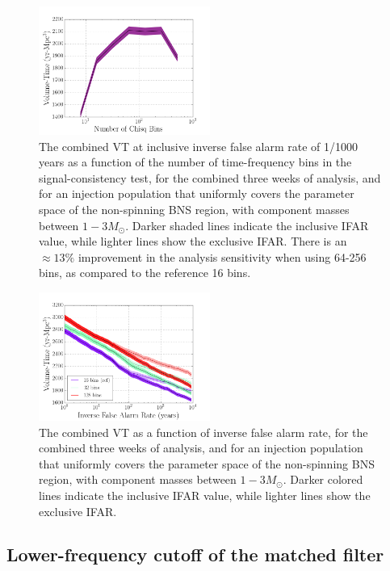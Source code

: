 \begin{figure}
\centering
\includegraphics[width=0.5\textwidth]{papers/bns_o1_dev/figures/cb.png}
\caption{\label{fig:vbin} 
The combined VT at inclusive inverse false alarm rate of 1/1000 years as a function of the number of time-frequency bins in the signal-consistency test, for the combined three weeks of analysis, and for an injection population that uniformly covers the parameter space of the non-spinning BNS region, with component masses between $1- 3M_\odot$. Darker shaded lines indicate the inclusive IFAR value, while lighter lines show the exclusive IFAR.  There is an $\approx 13\% $ improvement in the analysis sensitivity when using 64-256 bins, as compared to the reference 16 bins.
}
\end{figure}

\begin{figure}
\centering
\includegraphics[width=0.5\textwidth]{papers/bns_o1_dev/figures/chisq_combined.png}
\caption{\label{fig:fchisq} 
The combined VT as a function of inverse false alarm rate, for the combined three weeks of analysis, and for an injection population that uniformly covers the parameter space of the non-spinning BNS region, with component masses between $1- 3M_\odot$. Darker colored lines indicate the inclusive IFAR value, while lighter lines show the exclusive IFAR. 
}
\end{figure}

\subsection{Lower-frequency cutoff of the matched filter}

